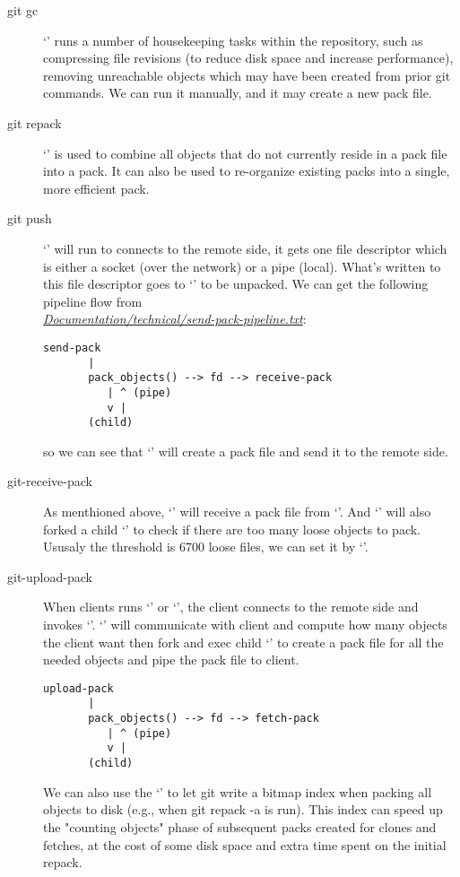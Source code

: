 \begin{description}
  \item[git gc] `\emph{}' runs a number of housekeeping tasks within the repository,
    such as compressing file revisions (to reduce disk space and increase performance), removing
    unreachable objects which may have been created from prior git commands.
    We can run it manually, and it may create a new pack file.
  \item[git repack] `\emph{}' is used to combine all objects that do not currently
    reside in a pack file into a pack. It can also be used to re-organize existing packs into
    a single, more efficient pack.
  \item[git push] `\emph{}' will run  to connects to the remote side,
    it gets one file descriptor which is either a socket (over the network) or a pipe (local).
    What's written to this file descriptor goes to `\emph{}' to be unpacked.
    We can get the following pipeline flow from\\
    \emph{\href{https://github.com/git/git/blob/master/Documentation/technical/send-pack-pipeline.txt}{Documentation/technical/send-pack-pipeline.txt}}:
    \begin{lstlisting}[basicstyle=\ttfamily]
    send-pack
       |
       pack_objects() --> fd --> receive-pack
          | ^ (pipe)
          v |
       (child)
    \end{lstlisting}
    so we can see that `\emph{}' will create a pack file and send it to the remote side.
  \item[git-receive-pack] As menthioned above, `\emph{}' will receive a pack file
    from `\emph{}'. And `\emph{}' will also forked a child
    `\emph{}' to check if there are too many loose objects to pack.
    Ususaly the threshold is 6700 loose files, we can set it by `\textbf{}'.
  \item[git-upload-pack] When clients runs `\emph{}' or `\emph{}', the
    client connects to the remote side and invokes `\emph{}'.
    `\emph{}' will communicate with client and compute how many objects the client
    want then fork and exec child `\emph{}' to create a pack file for all the
    needed objects and pipe the pack file to client.
    \begin{lstlisting}[basicstyle=\ttfamily]
    upload-pack
       |
       pack_objects() --> fd --> fetch-pack
          | ^ (pipe)
          v |
       (child)
    \end{lstlisting}

    We can also use the `\textbf{}' to let git write a bitmap index when packing
    all objects to disk (e.g., when git repack -a is run). This index can speed up the "counting
    objects" phase of subsequent packs created for clones and fetches, at the cost of some disk space
    and extra time spent on the initial repack.

\end{description}
